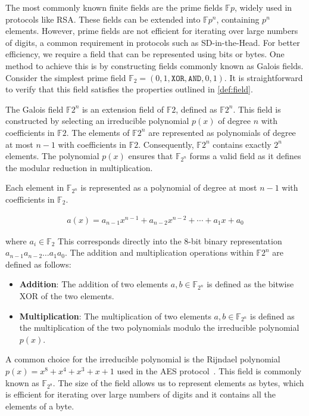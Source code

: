 \documentclass[twoside,11pt]{report}
\theoremstyle{definition}
\theoremstyle{plain}
\begin{document}
\noindent
The most commonly known finite fields are the prime fields $\mathbb{F}p$, widely used in protocols like RSA. These fields can be extended into $\mathbb{F}{p^n}$, containing $p^n$ elements. However, prime fields are not efficient for iterating over large numbers of digits, a common requirement in protocols such as SD-in-the-Head. For better efficiency, we require a field that can be represented using bits or bytes. One method to achieve this is by constructing fields commonly known as Galois fields. Consider the simplest prime field $\mathbb{F}_2 = ({0,1}, \texttt{XOR}, \texttt{AND}, 0, 1)$. It is straightforward to verify that this field satisfies the properties outlined in \autoref{def:field}.

The Galois field $\mathbb{F}{2^n}$ is an extension field of $\mathbb{F}2$, defined as $\mathbb{F}{2^n}$. This field is constructed by selecting an irreducible polynomial $p(x)$ of degree $n$ with coefficients in $\mathbb{F}2$. The elements of $\mathbb{F}{2^n}$ are represented as polynomials of degree at most $n-1$ with coefficients in $\mathbb{F}2$. Consequently, $\mathbb{F}{2^n}$ contains exactly $2^n$ elements. The polynomial $p(x)$ ensures that $\mathbb{F}_{2^n}$ forms a valid field as it defines the modular reduction in multiplication.

Each element in $\mathbb{F}_{2^n}$ is represented as a polynomial of degree at most $n-1$ with coefficients in $\mathbb{F}_2$.

\begin{align*}
  a(x) = a_{n-1}x^{n-1} + a_{n-2}x^{n-2} + \cdots + a_1x + a_0
\end{align*}

where $a_i \in \mathbb{F}_2$ This corresponds directly into the 8-bit binary representation $a_{n-1}a_{n-2}\dots a_1a_0$. The addition and multiplication operations within $\mathbb{F}{2^n}$ are defined as follows:

\begin{itemize}
  \item \textbf{Addition}: The addition of two elements $a,b \in \mathbb{F}_{2^n}$ is defined as the bitwise XOR of the two elements.
  \item \textbf{Multiplication}: The multiplication of two elements $a,b \in \mathbb{F}_{2^n}$ is defined as the multiplication of the two polynomials modulo the irreducible polynomial $p(x)$.
\end{itemize}

A common choice for the irreducible polynomial is the Rijndael polynomial $p(x) = x^8 + x^4 + x^3 + x + 1$ used in the AES protocol~\cite{brownadvanced}. This field is commonly known as $\mathbb{F}_{2^8}$. The size of the field allows us to represent elements as bytes, which is efficient for iterating over large numbers of digits and it contains all the elements of a byte.
\end{document}
